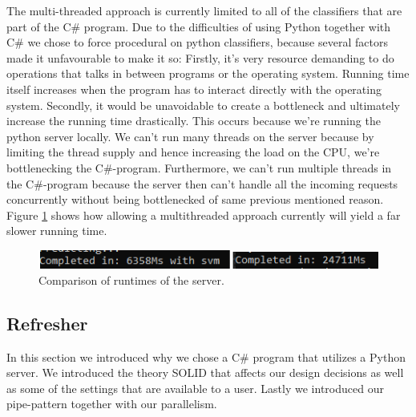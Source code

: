 The multi-threaded approach is currently limited to all of the classifiers that are part of the C\# program. Due to the difficulties of using Python together with C\# we chose to force procedural on python classifiers, because several factors made it unfavourable to make it so:
Firstly, it’s very resource demanding to do operations that talks in between programs or the operating system.
Running time itself increases when the program has to interact directly with the operating system. 
Secondly, it would be unavoidable to create a bottleneck and ultimately increase the running time drastically. This occurs because we’re running the python server locally. We can’t run many threads on the server because by limiting the thread supply and hence increasing the load on the CPU, we’re bottlenecking the C\#-program. Furthermore, we can’t run multiple threads in the C\#-program because the server then can’t handle all the incoming requests concurrently without being bottlenecked of same previous mentioned reason. Figure \ref{multiserv} shows how allowing a multithreaded approach currently will yield a far slower running time.
\begin{figure}[H]
	\includegraphics[width=\textwidth]{Images/MultithreadServer}
	\centering
	\caption{Comparison of runtimes of the server.}
	\label{multiserv}
\end{figure}

\subsection{Refresher}
In this section we introduced why we chose a C\# program that utilizes a Python server. We introduced the theory SOLID that affects our design decisions as well as some of the settings that are available to a user. Lastly we introduced our pipe-pattern together with our parallelism.
